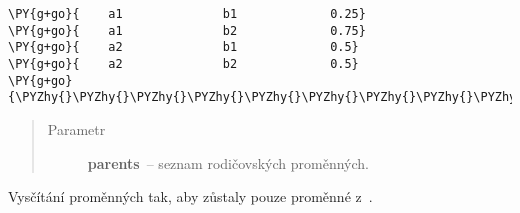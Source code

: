\begin{fulllineitems}
\begin{fulllineitems}
\begin{Verbatim}[commandchars=\\\{\}]
\PY{g+go}{    a1              b1             0.25}
\PY{g+go}{    a1              b2             0.75}
\PY{g+go}{    a2              b1             0.5}
\PY{g+go}{    a2              b2             0.5}
\PY{g+go}{\PYZhy{}\PYZhy{}\PYZhy{}\PYZhy{}\PYZhy{}\PYZhy{}\PYZhy{}\PYZhy{}\PYZhy{}\PYZhy{}\PYZhy{}\PYZhy{}\PYZhy{}\PYZhy{}\PYZhy{}\PYZhy{}\PYZhy{}\PYZhy{}\PYZhy{}\PYZhy{}\PYZhy{}\PYZhy{}\PYZhy{}\PYZhy{}\PYZhy{}\PYZhy{}\PYZhy{}\PYZhy{}\PYZhy{}\PYZhy{}\PYZhy{}\PYZhy{}\PYZhy{}\PYZhy{}\PYZhy{}\PYZhy{}\PYZhy{}\PYZhy{}\PYZhy{}\PYZhy{}\PYZhy{}\PYZhy{}\PYZhy{}\PYZhy{}\PYZhy{}\PYZhy{}\PYZhy{}\PYZhy{}\PYZhy{}\PYZhy{}}
\end{Verbatim}
\begin{quote}\begin{description}
\item[{Parametr}] \leavevmode
\textbf{parents}~-- seznam rodičovských proměnných.

\end{description}\end{quote}

\end{fulllineitems}


\begin{fulllineitems}
\label{alex.infer:alex.infer.factor.Factor.marginalize}
Vysčítání proměnných tak, aby zůstaly pouze proměnné z~.


\end{fulllineitems}
\end{fulllineitems}
